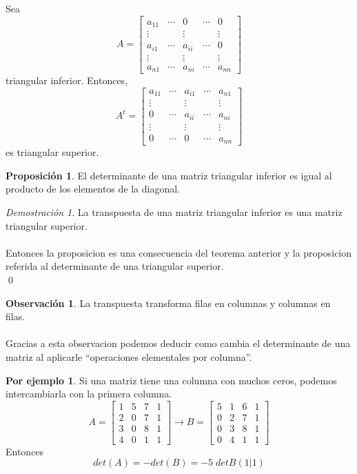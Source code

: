 \documentclass{article}
\theoremstyle{definition}
\theoremstyle{definition}
\newtheorem*{obs}{Observación}
\newtheorem{prop}[teo]{Proposición}
\newtheorem*{ej}{Por ejemplo}
\theoremstyle{remark}
\newtheorem*{demo}{Demostración}
\begin{document}
Sea \[
  A=\begin{bmatrix} a_{11} & \cdots & 0 & \cdots & 0 \\ \vdots & & \vdots && \vdots \\ a_{i1} & \cdots & a_{ii} & \cdots & 0 \\ \vdots && \vdots && \vdots \\ a_{n1} & \cdots & a_{ni} & \cdots & a_{nn} \end{bmatrix}
\]
triangular inferior. Entonces, \[
  A^t=\begin{bmatrix} a_{11} & \cdots & a_{i1} & \cdots & a_{n1}  \\ \vdots && \vdots && \vdots \\ 0 & \cdots & a_{ii} & \cdots & a_{ni} \\ \vdots && \vdots && \vdots \\0 & \cdots & 0 & \cdots & a_{nn} \end{bmatrix}
\]
es triangular superior.
\begin{prop}
  El determinante de una matriz triangular inferior es igual al producto de los elementos de la diagonal.
\end{prop}
\begin{demo}
  La transpuesta de una matriz triangular inferior es una matriz triangular superior. \\\\ Entonces la proposicion es una consecuencia del teorema anterior y la proposicion referida al determinante de una triangular superior. \\ \qed
\end{demo}
\begin{obs}
  La transpuesta transforma filas en columnas y columnas en filas. \\\\ Gracias a esta observacion podemos deducir como cambia el determinante de una matriz al aplicarle ``operaciones elementales por columna''.
\end{obs}
\begin{ej}
  Si una matriz tiene una columna con muchos ceros, podemos intercambiarla con la primera columna. \[
    A=\begin{bmatrix} 1 & 5 & 7 & 1 \\ 2 & 0 & 7 & 1 \\ 3 & 0 & 8 & 1 \\ 4 & 0 & 1 & 1 \end{bmatrix} \longrightarrow B=\begin{bmatrix} 5 & 1 & 6 & 1 \\ 0 & 2 & 7 & 1 \\ 0 & 3 & 8 & 1 \\ 0 & 4 & 1 & 1 \end{bmatrix}
  \]
  Entonces \[
det(A)=-det(B)=-5\; detB(1|1)
  \]
\end{ej}
\end{document}
